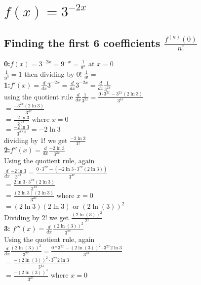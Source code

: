 \documentclass{article}
\begin{document}
\section{$f(x) = 3^{-2x}$}
\begin{multicols*}{2}
    \subsection*{Finding the first 6 coefficients $\frac{f^{(n)}(0)}{n!}$}
    \textbf{0:}$f(x) =  3^{-2x}= 9^{-x} = \frac{1}{9^x}$ at $x=0$
    \\[0.05in]$\frac{1}{9^0}=1$ then dividing by 0! $\frac{1}{0!}=$
    \\[0.05in]\textbf{1:}$f'(x) = \frac{d}{dx} 3^{-2x}=\frac{d}{dx} 3^{-2x} =\frac{d}{dx} \frac{1}{3^{2x}}$
    \\[0.1in]using the quotient rule $\frac{d}{dx} \frac{1}{3^{2x}} = \frac{0\cdot3^{2x}-3^{2x}(2\ln3)}{3^{4x}}$
    \\[0.1in]$= \frac{-3^{2x}(2\ln3)}{3^{4x}}$
    \\[0.1in]$= \frac{-2\ln3}{3^{2x}}$ where $x=0$
    \\[0.1in]$= \frac{-2\ln3}{3^{2*0}}=-2\ln3$
    \\[0in] dividing by $1!$ we get $\boxed{\frac{-2\ln3} {1!}}$
    \\[0.1in]\textbf{2:}$f''(x) = \frac{d}{dx} \frac{-2\ln3}{3^{2x}}$
    \\[0.1in]Using the quotient rule, again \\[0.02in]$\frac{d}{dx} \frac{-2\ln3}{3^{2x}}= \frac{0\cdot 3^{2x} -(-2\ln3\cdot3^{2x}(2\ln3))}{3^{4x}}$
    \\[0.1in] $= \frac{2\ln3\cdot3^{2x}(2\ln3)}{3^{4x}}$
    \\[0.1in] $= \frac{(2\ln3)(2\ln3)}{3^{2x}}$ where $x=0$
    \\[0.1in] $= (2\ln3)(2\ln3) $ or $(2\ln(3))^2$
    \\[0in]Dividing by 2! we get $\boxed{\frac{(2\ln(3))^2}{2!}}$
    \\[0.1in]\textbf{3:} $f'''(x)= \frac{d}{dx} \frac{(2\ln(3))^2}{3^{2x}}$ 
    \\[0.1in]Using the quotient rule, again \\[0.05in]$\frac{d}{dx} \frac{(2\ln(3))^2}{3^{2x}} = \frac{0*3^{2x}-(2\ln(3))^2\cdot3^{2x}2\ln3}{3^{4x}}$ 
    \\[0.1in] $ = \frac{-(2\ln(3))^2\cdot3^{2x}2\ln3}{3^{4x}}$ 
    \\[0.1in] $ = \frac{-(2\ln(3))^3}{3^{2x}}$ where $x=0$

\end{multicols*}
\end{document}
